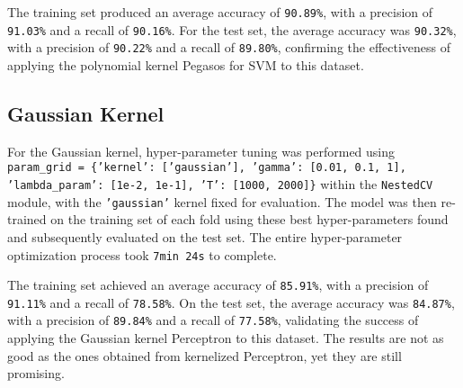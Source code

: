 The training set produced an average accuracy of \texttt{90.89\%}, with a precision of \texttt{91.03\%} and a recall of \texttt{90.16\%}. For the test set, the average accuracy was \texttt{90.32\%}, with a precision of \texttt{90.22\%} and a recall of \texttt{89.80\%}, confirming the effectiveness of applying the polynomial kernel Pegasos for SVM to this dataset.

\subsection{Gaussian Kernel}

For the Gaussian kernel, hyper-parameter tuning was performed using \texttt{param\_grid = \{'kernel': ['gaussian'], 'gamma': [0.01, 0.1, 1], 'lambda\_param': [1e-2, 1e-1], 'T': [1000, 2000]\}} within the \texttt{NestedCV} module, with the \texttt{'gaussian'} kernel fixed for evaluation. The model was then re-trained on the training set of each fold using these best hyper-parameters found and subsequently evaluated on the test set. The entire hyper-parameter optimization process took \texttt{7min 24s} to complete.

The training set achieved an average accuracy of \texttt{85.91\%}, with a precision of \texttt{91.11\%} and a recall of \texttt{78.58\%}. On the test set, the average accuracy was \texttt{84.87\%}, with a precision of \texttt{89.84\%} and a recall of \texttt{77.58\%}, validating the success of applying the Gaussian kernel Perceptron to this dataset. The results are not as good as the ones obtained from kernelized Perceptron, yet they are still promising.